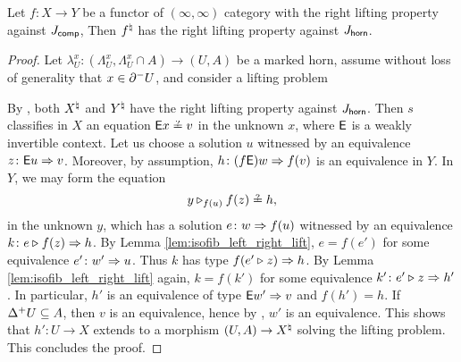 \begin{lem} \label{lem:isofib_rlp_marked_horn}
    Let \( f \colon X \to Y \) be a functor of \( (\infty, \infty) \) category with the right lifting property against \( J_{\mathsf{comp}} \),
    Then \( {f}^{\natural} \) has the right lifting property against \( J_{\mathsf{horn}} \).
\end{lem}
\begin{proof}
    Let \( \lambda^x_U \colon (\Lambda^x_U, \Lambda^x_U \cap A) \to (U, A) \) be a marked horn, assume without loss of generality that \( x \in \partial_{}^{-} U \), and consider a lifting problem
    \begin{center}
    \end{center}
    By \cite[Theorem 4.9]{chanavat2024model}, both \( {X}^{\natural} \) and \( {Y}^{\natural} \) have the right lifting property against \( J_{\mathsf{horn}} \).
    Then \( s \) classifies in \( X \) an equation \( \fun{E}x \qeq v \) in the unknown \( x \), where \( \mathsf{E} \) is a weakly invertible context. 
    Let us choose a solution \( u \) witnessed by an equivalence \( z \colon \mathsf{E}u \Rightarrow v \).
    Moreover, by assumption, \( h \colon (f\mathsf{E})w \Rightarrow f(v) \) is an equivalence in \( Y \).
    In \( Y \), we may form the equation 
    \begin{equation*}
        y \cpsub{f(u)} f(z) \qeq h,
    \end{equation*}
    in the unknown \( y \), which has a solution \( e \colon w \Rightarrow f(u) \) witnessed by an equivalence \( k \colon e \triangleright_{} f(z) \Rightarrow h \).
    By Lemma \ref{lem:isofib_left_right_lift}, \( e = f(e') \) for some equivalence \( e' \colon w' \Rightarrow u \).
    Thus \( k \) has type \( f(e' \triangleright_{} z) \Rightarrow h \).
    By Lemma \ref{lem:isofib_left_right_lift} again, \( k = f(k') \) for some equivalence \( k' \colon e' \triangleright_{} z \Rightarrow h' \).
    In particular, \( h' \) is an equivalence of type \( \mathsf{E}w' \Rightarrow v \) and \( f(h') = h \).
    If \( \Delta_{}^{+} U \subseteq A \), then \( v \) is an equivalence, hence by \cite[Theorem 5.22]{chanavat2024equivalences}, \( w' \) is an equivalence.
    This shows that \( h' \colon U \to X \) extends to a morphism \( (U, A) \to {X}^{\natural} \) solving the lifting problem.
    This concludes the proof.
\end{proof}

